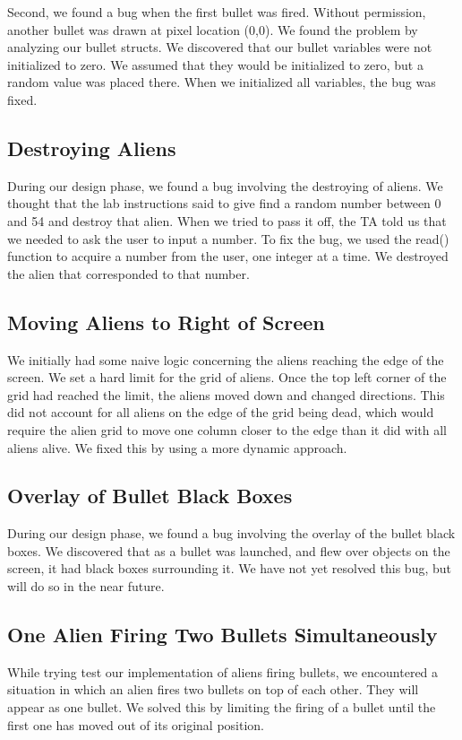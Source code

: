 \documentclass[11pt,letter,oneside]{report}
\begin{document}
Second, we found a bug when the first bullet was fired. Without permission, another bullet was drawn at pixel location (0,0). We found the problem by analyzing our bullet structs. We discovered that our bullet variables were not initialized to zero. We assumed that they would be initialized to zero, but a random value was placed there. When we initialized all variables, the bug was fixed.

\subsection{Destroying Aliens}
During our design phase, we found a bug involving the destroying of aliens. We thought that the lab instructions said to give find a random number between 0 and 54 and destroy that alien. When we tried to pass it off, the TA told us that we needed to ask the user to input a number. To fix the bug, we used the read() function to acquire a number from the user, one integer at a time. We destroyed the alien that corresponded to that number.

\subsection{Moving Aliens to Right of Screen}
We initially had some naive logic concerning the aliens reaching the edge of the screen.  We set a hard limit for the grid of aliens.  Once the top left corner of the grid had reached the limit, the aliens moved down and changed directions.  This did not account for all aliens on the edge of the grid being dead, which would require the alien grid to move one column closer to the edge than it did with all aliens alive.  We fixed this by using a more dynamic approach.

\subsection{Overlay of Bullet Black Boxes}
During our design phase, we found a bug involving the overlay of the bullet black boxes. We discovered that as a bullet was launched, and flew over objects on the screen, it had black boxes surrounding it. We have not yet resolved this bug, but will do so in the near future.

\subsection{One Alien Firing Two Bullets Simultaneously}
While trying test our implementation of aliens firing bullets, we encountered a situation in which an alien fires two bullets on top of each other.  They will appear as one bullet.  We solved this by limiting the firing of a bullet until the first one has moved out of its original position. 
\end{document}
